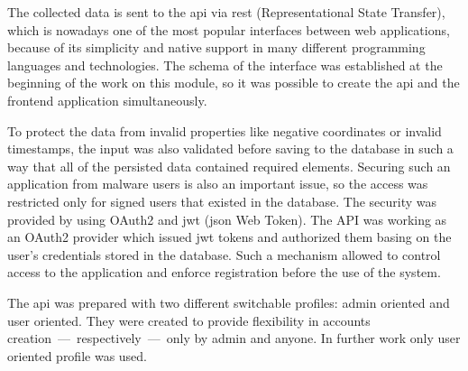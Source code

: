 The collected data is sent to the \gls{api} via \gls{rest} (Representational State Transfer), which is nowadays one of the most popular interfaces between web applications, because of its simplicity and native support in many different programming languages and technologies.
The schema of the interface was established at the beginning of the work on this module, so it was possible to create the \gls{api} and the frontend application simultaneously.

To protect the data from invalid properties like negative coordinates or invalid timestamps, the input was also validated before saving to the database in such a way that all of the persisted data contained required elements.
Securing such an application from malware users is also an important issue, so the access was restricted only for signed users that existed in the database.
The security was provided by using OAuth2 and \gls{jwt} (\gls{json} Web Token).
The API was working as an OAuth2 provider which issued \gls{jwt} tokens and authorized them basing on the user's credentials stored in the database.
Such a mechanism allowed to control access to the application and enforce registration before the use of the system.

The \gls{api} was prepared with two different switchable profiles: admin oriented and user oriented.
They were created to provide flexibility in accounts creation~---~respectively~---~only by admin and anyone.
In further work only user oriented profile was used.